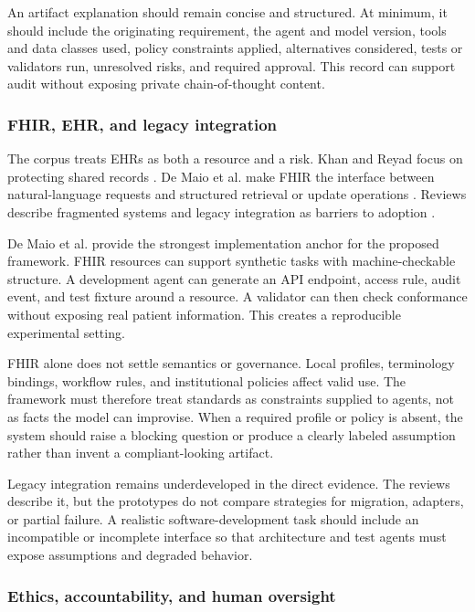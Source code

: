 \documentclass[11pt,a4paper]{article}
\begin{document}
An artifact explanation should remain concise and structured. At minimum, it should include the originating requirement, the agent and model version, tools and data classes used, policy constraints applied, alternatives considered, tests or validators run, unresolved risks, and required approval. This record can support audit without exposing private chain-of-thought content.

\subsubsection{FHIR, EHR, and legacy integration}

The corpus treats EHRs as both a resource and a risk. Khan and Reyad focus on protecting shared records \cite{khan2019ibac}. De Maio et al. make FHIR the interface between natural-language requests and structured retrieval or update operations \cite[pp.~1--8]{demaio2025privacy}. Reviews describe fragmented systems and legacy integration as barriers to adoption \cite{saeed2025applications,okeke2025overview,boye2025decision}.

De Maio et al. provide the strongest implementation anchor for the proposed framework. FHIR resources can support synthetic tasks with machine-checkable structure. A development agent can generate an API endpoint, access rule, audit event, and test fixture around a resource. A validator can then check conformance without exposing real patient information. This creates a reproducible experimental setting.

FHIR alone does not settle semantics or governance. Local profiles, terminology bindings, workflow rules, and institutional policies affect valid use. The framework must therefore treat standards as constraints supplied to agents, not as facts the model can improvise. When a required profile or policy is absent, the system should raise a blocking question or produce a clearly labeled assumption rather than invent a compliant-looking artifact.

Legacy integration remains underdeveloped in the direct evidence. The reviews describe it, but the prototypes do not compare strategies for migration, adapters, or partial failure. A realistic software-development task should include an incompatible or incomplete interface so that architecture and test agents must expose assumptions and degraded behavior.

\subsubsection{Ethics, accountability, and human oversight}
\end{document}

